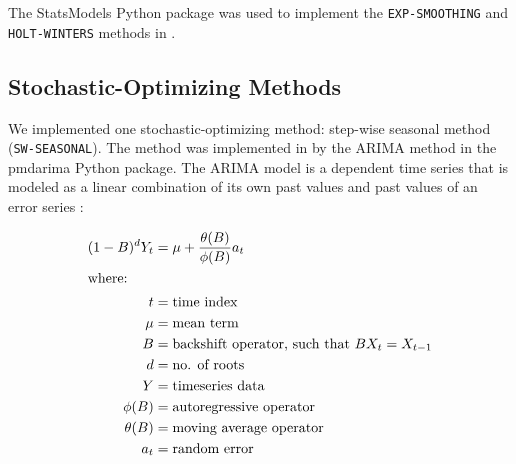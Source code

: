\noindent
The StatsModels \cite{seabold_statsmodels:_2010}
Python package was used to implement the \texttt{EXP-SMOOTHING} 
and \texttt{HOLT-WINTERS} methods in \deploy. 

\subsection{Stochastic-Optimizing Methods}
We implemented one stochastic-optimizing method: step-wise 
seasonal method (\texttt{SW-SEASONAL}).
The method was implemented in \deploy by the \gls{ARIMA} 
method in the pmdarima \cite{smith_pmdarima:_2017}
Python package. 
The \gls{ARIMA} model is a dependent time series that is 
modeled as a linear combination of its own past values 
and past values of an error series \cite{institute_sas_1985}: 

\begin{align}
    (1-B)^dY_t &= \mu + \frac{\theta(B)}{\phi(B)}a_t \\ 
    \intertext{where:}
    t &= \mbox{time index} \nonumber \\
    \mu &= \mbox{mean term} \nonumber \\
    B &= \mbox{backshift operator, such that } BX_t = X_{t-1} \nonumber \\
    d &= \mbox{no. of roots} \nonumber \\
    Y &= \mbox{timeseries data} \nonumber \\
    \phi(B) &= \mbox{autoregressive operator} \nonumber \\
    \theta(B) &= \mbox{moving average operator} \nonumber \\
    a_t &= \mbox{random error} \nonumber 
\end{align}

